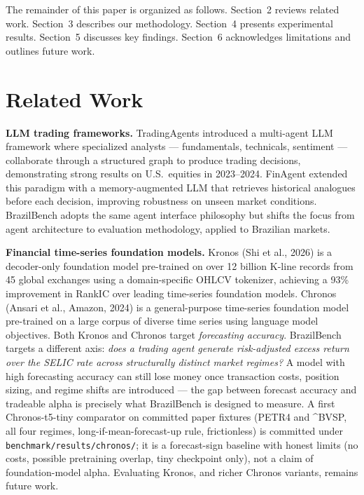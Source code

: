 \documentclass{article}
\begin{document}
The remainder of this paper is organized as follows. Section~2 reviews
related work. Section~3 describes our methodology. Section~4 presents
experimental results. Section~5 discusses key findings. Section~6
acknowledges limitations and outlines future work.

\section{Related Work}

\textbf{LLM trading frameworks.}
TradingAgents \cite{tradingagents2024} introduced a multi-agent LLM
framework where specialized analysts --- fundamentals, technicals,
sentiment --- collaborate through a structured graph to produce trading
decisions, demonstrating strong results on U.S.\ equities in 2023--2024.
FinAgent \cite{finagent2024} extended this paradigm with a
memory-augmented LLM that retrieves historical analogues before each
decision, improving robustness on unseen market conditions. BrazilBench
adopts the same agent interface philosophy but shifts the focus from
agent architecture to evaluation methodology, applied to Brazilian
markets.

\textbf{Financial time-series foundation models.}
Kronos \cite{kronos2025} (Shi et al., 2026) is a decoder-only foundation model pre-trained
on over 12 billion K-line records from 45 global exchanges using a
domain-specific OHLCV tokenizer, achieving a 93\% improvement in RankIC
over leading time-series foundation models.
Chronos \cite{chronos2024} (Ansari et al., Amazon, 2024) is a
general-purpose time-series foundation model pre-trained on a large
corpus of diverse time series using language model objectives. Both
Kronos and Chronos target \textit{forecasting accuracy}. BrazilBench
targets a different axis: \textit{does a trading agent generate
risk-adjusted excess return over the SELIC rate across structurally
distinct market regimes?} A model with high forecasting accuracy can
still lose money once transaction costs, position sizing, and regime
shifts are introduced --- the gap between forecast accuracy and
tradeable alpha is precisely what BrazilBench is designed to measure.
A first Chronos-t5-tiny comparator on committed paper fixtures (PETR4 and \textasciicircum BVSP, all four regimes, long-if-mean-forecast-up rule, frictionless) is committed under
\texttt{benchmark/results/chronos/}; it is a forecast-sign baseline with honest limits (no costs, possible pretraining overlap, tiny checkpoint only), not a claim of foundation-model alpha. Evaluating Kronos, and richer Chronos variants, remains future
work.
\end{document}
